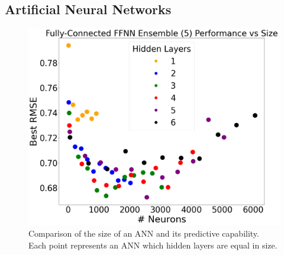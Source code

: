 \documentclass[a4paper, twoside, final, 12pt]{article}
\begin{document}
{
\vspace{2cm}
\subsection{Artificial Neural Networks}

\begin{figure}
	\centering
	\includegraphics[scale=0.2]{./src/ANN_performace_size_v2}
	\caption{Comparison of the size of an ANN and its predictive capability. Each point represents an ANN which hidden layers are equal in size.}
	\label{fig:ANN_dim}
\end{figure}
}
\end{document}
